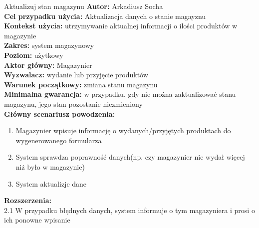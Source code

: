 \begin{usecase}{Aktualizuj stan magazynu}
	\textbf{Autor:} Arkadiusz Socha\\
	\textbf{Cel przypadku użycia:} Aktualizacja danych o stanie magayznu \\
	\textbf{Kontekst użycia:} utrzymywanie aktualnej informacji o ilości produktów w magazynie \\
	\textbf{Zakres:} system magazynowy \\
	\textbf{Poziom:} użytkowy \\
	\textbf{Aktor główny:} Magazynier \\
	\textbf{Wyzwalacz:} wydanie lub przyjęcie produktów \\
	\textbf{Warunek początkowy:} zmiana stanu magazynu \\
	\textbf{Minimalna gwarancja:} w przypadku, gdy nie można zaktualizować stanu magazynu, jego stan pozostanie niezmieniony \\
	\textbf{Główny scenariusz powodzenia:} 
		\begin{enumerate}
			\item Magazynier wpisuje informację o wydanych/przyjętych produktach do wygenerowanego formularza
			\item System sprawdza poprawność danych(np. czy magazynier nie wydał więcej niż było w magazynie)
			\item System aktualizje dane
		\end{enumerate}
	\textbf{Rozszerzenia:} \\
	2.1 W przypadku błędnych danych, system informuje o tym magazyniera i prosi o ich ponowne wpisanie\\
\end{usecase}


